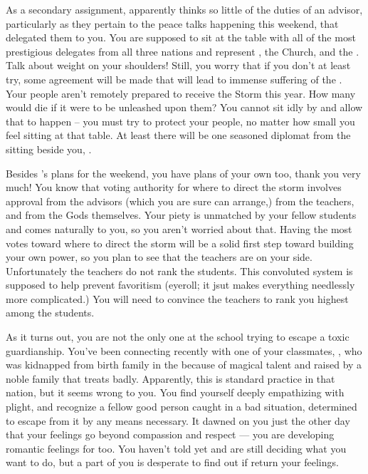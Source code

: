 \documentclass[char]{GL2020}
\begin{document}
As a secondary assignment, \cAntiChup{} apparently thinks so little of the duties of an advisor, particularly as they pertain to the peace talks happening this weekend, that \cAntiChup{\they} \cAntiChup{\have} delegated them to you. You are supposed to sit at the table with all of the most prestigious delegates from all three nations and represent \cAntiChup{}, the Church, and the \pTech{}. Talk about weight on your shoulders! Still, you worry that if you don't at least try, some agreement will be made that will lead to immense suffering of the \pTech{}. Your people aren't remotely prepared to receive the Storm this year. How many would die if it were to be unleashed upon them? You cannot sit idly by and allow that to happen – you must try to protect your people, no matter how small you feel sitting at that table. At least there will be one seasoned diplomat from the \pTech{} sitting beside you, \cDiplomat{}.

Besides \cAntiChup{}'s plans for the weekend, you have plans of your own too, thank you very much! You know that voting authority for where to direct the storm involves approval from the advisors (which you are sure \cAntiChup{} can arrange,) from the teachers, and from the Gods themselves. Your piety is unmatched by your fellow students and comes naturally to you, so you aren't worried about that. Having the most votes toward where to direct the storm will be a solid first step toward building your own power, so you plan to see that the teachers are on your side. Unfortunately the \pTech{} teachers do not rank the \pTech{} students. This convoluted system is supposed to help prevent favoritism (eyeroll; it jsut makes everything needlessly more complicated.) You will need to convince the \pShippie{} teachers to rank you highest among the \pTech{} students.

As it turns out, you are not the only one at the school trying to escape a toxic guardianship. You've been connecting recently with one of your classmates, \cAdopted{\full}, who was kidnapped from \cAdopted{\their} birth family in the \pFarm{} because of \cAdopted{\their} magical talent and raised by a noble family that treats \cAdopted{\them} badly. Apparently, this is standard practice in that nation, but it seems wrong to you. You find yourself deeply empathizing with \cAdopted{\their} plight, and recognize a fellow good person caught in a bad situation, determined to escape from it by any means necessary. It dawned on you just the other day that your feelings go beyond compassion and respect — you are developing romantic feelings for \cAdopted{\them} too. You haven't told  \cAdopted{} yet and are still deciding what you want to do, but a part of you is desperate to find out if \cAdopted{\they} return your feelings.
\end{document}
